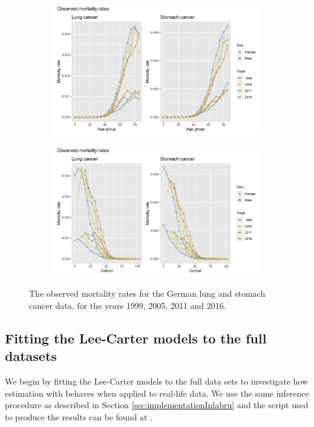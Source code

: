 \begin{figure}
    \centering
    \begin{subfigure}[b]{.6\linewidth}
        \includegraphics[width=\linewidth]{real-data/real-data-univariate/Figures/data-age-rate.png}
    \end{subfigure}
    
    \begin{subfigure}[b]{.6\linewidth}
        \includegraphics[width=\linewidth]{real-data/real-data-univariate/Figures/data-cohort-rate.png}
    \end{subfigure}
    \caption{The observed mortality rates for the German lung and stomach cancer data, for the years 1999, 2005, 2011 and 2016.}
    \label{fig:data-rate}
\end{figure}

\subsection{Fitting the Lee-Carter models to the full datasets}
\label{sec:LC-full-data}
We begin by fitting the Lee-Carter models to the full data sets to investigate how estimation with \inlabru behaves when applied to real-life data. We use the same inference procedure as described in Section \ref{sec:implementationInlabru} and the script used to produce the results can be found at 
.

